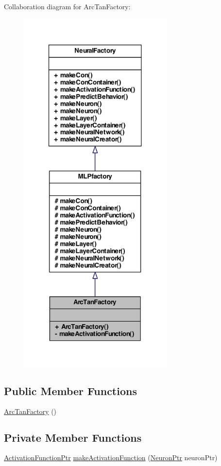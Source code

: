 Collaboration diagram for ArcTanFactory:
\nopagebreak
\begin{figure}[H]
\begin{center}
\leavevmode
\includegraphics[width=222pt]{class_arc_tan_factory__coll__graph}
\end{center}
\end{figure}
\subsection*{Public Member Functions}
\begin{DoxyCompactItemize}
\item 
\hyperlink{class_arc_tan_factory_a2f3bb205588da069f2cc44dc90cf5633}{ArcTanFactory} ()
\end{DoxyCompactItemize}
\subsection*{Private Member Functions}
\begin{DoxyCompactItemize}
\item 
\hyperlink{_a_m_o_r_e_8h_a77602a0277a02e5769c3df0adc669b17}{ActivationFunctionPtr} \hyperlink{class_arc_tan_factory_ae07c1b383c55ee42732d97fb2215d7fb}{makeActivationFunction} (\hyperlink{_a_m_o_r_e_8h_ac1ea936c2c7728eb382278131652fef4}{NeuronPtr} neuronPtr)
\end{DoxyCompactItemize}


